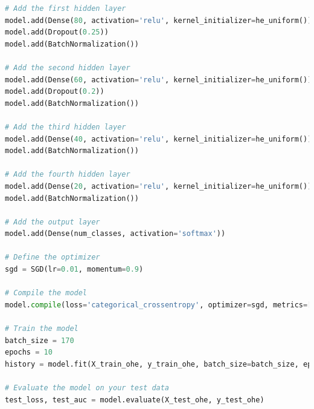 \begin{appendices}
\begin{lstlisting}[language=Python]
# Add the first hidden layer
model.add(Dense(80, activation='relu', kernel_initializer=he_uniform()))
model.add(Dropout(0.25))
model.add(BatchNormalization())

# Add the second hidden layer
model.add(Dense(60, activation='relu', kernel_initializer=he_uniform()))
model.add(Dropout(0.2))
model.add(BatchNormalization())

# Add the third hidden layer
model.add(Dense(40, activation='relu', kernel_initializer=he_uniform()))
model.add(BatchNormalization())

# Add the fourth hidden layer
model.add(Dense(20, activation='relu', kernel_initializer=he_uniform()))
model.add(BatchNormalization())

# Add the output layer
model.add(Dense(num_classes, activation='softmax'))

# Define the optimizer
sgd = SGD(lr=0.01, momentum=0.9)

# Compile the model
model.compile(loss='categorical_crossentropy', optimizer=sgd, metrics=[AUC()])

# Train the model
batch_size = 170
epochs = 10
history = model.fit(X_train_ohe, y_train_ohe, batch_size=batch_size, epochs=epochs, validation_data=(X_test_ohe, y_test_ohe))

# Evaluate the model on your test data
test_loss, test_auc = model.evaluate(X_test_ohe, y_test_ohe)
\end{lstlisting}


\newpage

\end{appendices}


